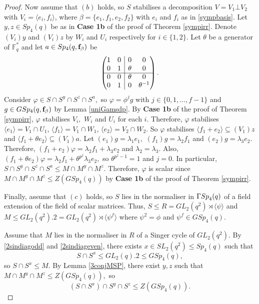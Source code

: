 \begin{proof}
Now assume  that $(b)$ holds, so $S$ stabilises a decomposition $V= V_1 \bot V_2$ with $V_i= \langle e_i, f_i \rangle$, where $\beta =\{e_1, f_1, e_2, f_2\}$ with $e_i$ and $f_i$ as in \eqref{sympbasis}. Let $y,z \in Sp_4(q)$ be as in {\bf Case 1b} of the proof of Theorem \ref{sympirr}. Denote $(V_i)y$ and $(V_i)z$ by $W_i$ and $U_i$ respectively for $i \in \{1,2\}.$ Let $\theta$ be a generator of $\mathbb{F}_q^*$ and let $a \in Sp_4(q, {\bf f}_{\beta})$
be $$\begin{pmatrix}
1      & \multicolumn{1}{c|}{0}& 0& 0   \\
0      & \multicolumn{1}{c|}{1}& \theta & 0 \\ \cline{1-4}
0      & \multicolumn{1}{c|}{0}& \theta & 0   \\
0      & \multicolumn{1}{c|}{1}& 0 & \theta^{-1}
\end{pmatrix}.$$
Consider $\varphi \in S \cap S^y \cap S^z \cap S^a,$ so $\varphi = \phi^j g$ with $j \in \{0,1, \ldots, f-1\}$ and $g \in GSp_4(q, {\bf f}_{\beta})$ by Lemma \ref{uniGamsdp}. By {\bf Case 1b} of the proof of Theorem \ref{sympirr}, $\varphi$ stabilises $V_i,$ $W_i$ and $U_i$ for each $i.$ Therefore, $\varphi$ stabilises 
$\langle e_1 \rangle=V_1 \cap U_1$, $\langle f_1 \rangle=V_1 \cap W_1$, $\langle e_2 \rangle=V_2 \cap W_2$.  So $\varphi$ stabilises $\langle f_1 + e_2\rangle \subseteq (V_1)z$ and $\langle f_1 + \theta e_2\rangle \subseteq (V_1)a$. Let $(e_1)g= \lambda_1 e_1,$ $(f_1)g= \lambda_2 f_1$ and $(e_2)g= \lambda_3 e_2$. Therefore,  $(f_1 + e_2)\varphi = \lambda_2 f_1+ \lambda_3 e_2$ and $\lambda_2=\lambda_3$. Also,    $(f_1 + \theta e_2)\varphi = \lambda_2 f_1+ \theta^{p^j}\lambda_3 e_2,$ so $\theta^{p^j-1}=1$ and $j=0.$ In particular, $S \cap S^y \cap S^z \cap S^a \le M \cap M^y \cap M^z$. Therefore, $\varphi$ is scalar since  $M \cap M^y \cap M^z \le Z(GSp_4(q))$ by {\bf Case 1b} of the proof of Theorem \ref{sympirr}.

\medskip

Finally, assume that $(c)$ holds, so $S$ lies in the normaliser in ${{\Gamma Sp}}_4(q)$ of a field extension of the field of scalar matrices. Thus, $S \le R=GL_2(q^2)\rtimes \langle \psi \rangle$ and 
$M \le GL_2(q^2).2= GL_2(q^2)\rtimes \langle \psi^f \rangle$ where $\psi^2 = \phi$ and $\psi^f \in GSp_4(q).$ 

Assume that $M$ lies in the normaliser in  $R$ of a Singer cycle of $GL_2(q^2).$ By \eqref{2sindiagodd} and \eqref{2sindiageven}, there exists $x \in SL_2(q^2)\le Sp_4(q)$ such that $$S \cap S^x \le  GL_2(q).2 \le GSp_4(q),$$ so $S \cap S^x \le M.$ By Lemma \ref{3conjMSP}, there exist $y,z$ such that $M \cap M^y \cap M^z \le Z(GSp_4(q)),$ so 
$$(S \cap S^x) \cap S^y \cap S^z \le Z(GSp_4(q)).$$


\end{proof}
